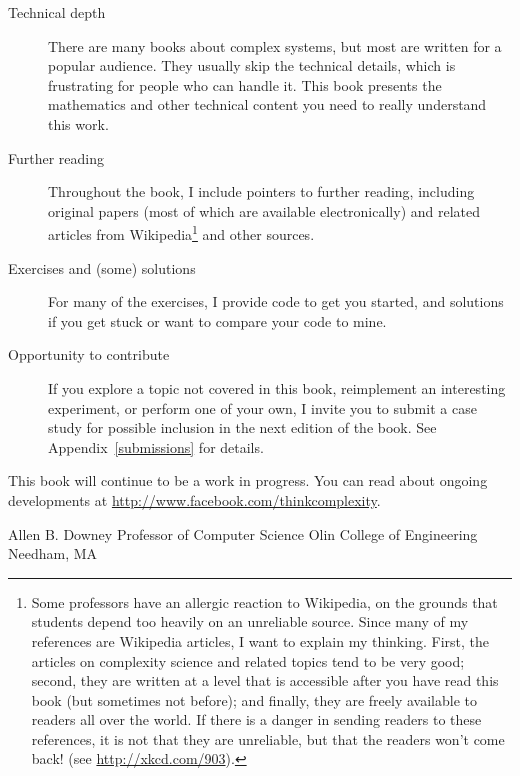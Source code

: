\documentclass[10pt]{book}
\begin{document}
\begin{description}

\item[Technical depth] There are many books about complex systems,
  but most are written for a popular audience.  They usually skip the
  technical details, which is frustrating for people who can handle
  it.  This book presents the mathematics and other technical content
  you need to really understand this work.

\item[Further reading] Throughout the book, I include pointers to
  further reading, including original papers (most of which are
  available electronically) and related articles from
  Wikipedia\footnote{Some professors have an allergic reaction to
    Wikipedia, on the grounds that students depend too heavily on an
    unreliable source.  Since many of my references are Wikipedia
    articles, I want to explain my thinking.  First, the articles on
    complexity science and related topics tend to be very good;
    second, they are written at a level that is accessible after you
    have read this book (but sometimes not before); and finally, they
    are freely available to readers all over the world.  If there is a
    danger in sending readers to these references, it is not that they
    are unreliable, but that the readers won't come back!  (see
    \url{http://xkcd.com/903}).} and other sources.

\item[Exercises and (some) solutions] For many of the exercises, I
  provide code to get you started, and solutions if you get stuck or
  want to compare your code to mine.

\item[Opportunity to contribute] If you explore a topic not covered in
  this book, reimplement an interesting experiment, or perform one of
  your own, I invite you to submit a case study for possible inclusion
  in the next edition of the book.  See Appendix~\ref{submissions} for
  details.

\end{description}

This book will continue to be a work in progress.  You can read
about ongoing developments at \url{http://www.facebook.com/thinkcomplexity}.

\begin{flushleft}
Allen B. Downey \newline
Professor of Computer Science \newline
Olin College of Engineering \newline
Needham, MA
\end{flushleft}
\end{document}
